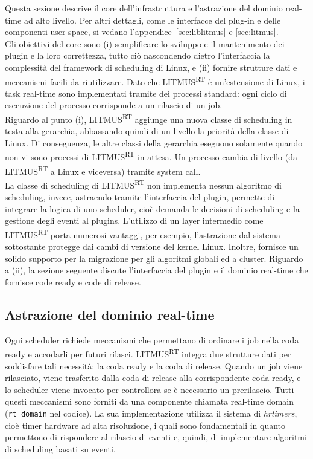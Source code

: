 Questa sezione descrive il core dell'infrastruttura e l'astrazione del dominio real-time ad alto livello. Per altri dettagli, come le interfacce del plug-in e delle componenti user-space, si vedano l'appendice~\ref{sec:liblitmus} e \ref{sec:litmus}.\\

Gli obiettivi del core sono (i) semplificare lo sviluppo e il mantenimento dei plugin e la loro correttezza, tutto ciò nascondendo dietro l'interfaccia la complessità del framework di scheduling di Linux, e (ii) fornire strutture dati e meccanismi facili da riutilizzare. Dato che LITMUS\textsuperscript{RT} è un'estensione di Linux, i task real-time sono implementati tramite dei processi standard: ogni ciclo di esecuzione del processo corrisponde a un rilascio di un job.\\
Riguardo al punto (i), LITMUS\textsuperscript{RT} aggiunge una nuova classe di scheduling in testa alla gerarchia, abbassando quindi di un livello la priorità della classe di Linux. Di conseguenza, le altre classi della gerarchia eseguono solamente quando non vi sono processi di LITMUS\textsuperscript{RT} in attesa. Un processo cambia di livello (da LITMUS\textsuperscript{RT} a Linux e viceversa) tramite system call.\\
La classe di scheduling di LITMUS\textsuperscript{RT} non implementa nessun algoritmo di scheduling, invece, astraendo tramite l'interfaccia del plugin, permette di integrare la logica di uno scheduler, cioè demanda le decisioni di scheduling e la gestione degli eventi al plugins.
L'utilizzo di un layer intermedio come LITMUS\textsuperscript{RT} porta numerosi vantaggi, per esempio, l'astrazione dal sistema sottostante protegge dai cambi di versione del kernel Linux. Inoltre, fornisce un solido supporto per la migrazione per gli algoritmi globali ed a cluster.
Riguardo a (ii), la sezione seguente discute l'interfaccia del plugin e il dominio real-time che fornisce code ready e code di release.

\subsection{Astrazione del dominio real-time}
\label{sec:intro.rt_domain}

Ogni scheduler richiede meccanismi che permettano di ordinare i job nella coda ready e accodarli per futuri rilasci. LITMUS\textsuperscript{RT} integra due strutture dati per soddisfare tali necessità: la coda ready e la coda di release. Quando un job viene rilasciato, viene trasferito dalla coda di release alla corrispondente coda ready, e lo scheduler viene invocato per controllora se è necessario un prerilascio. Tutti questi meccanismi sono forniti da una componente chiamata real-time domain (\texttt{rt\_domain} nel codice). La sua implementazione utilizza il sistema di \textit{hrtimers}, cioè timer hardware ad alta risoluzione, i quali sono fondamentali in quanto permettono di rispondere al rilascio di eventi e, quindi, di implementare algoritmi di scheduling basati su eventi.\\

